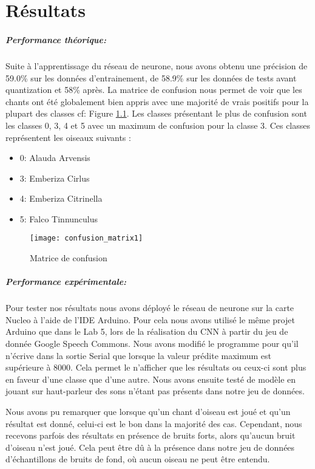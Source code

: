 \chapter{Résultats}


\paragraph{Performance théorique:} Suite à l'apprentissage du réseau de neurone, nous avons obtenu une précision de 59.0\% sur les données d'entrainement,
de 58.9\% sur les données de tests avant quantization et 58\% après.
La matrice de confusion nous permet de voir que les chants ont été globalement 
bien appris avec une majorité de vrais positifs pour la plupart des classes cf: Figure \ref{graph:confusion_matrix1}.
Les classes présentant le plus de confusion sont les classes 0, 3, 4 et 5 avec un maximum de confusion pour la classe 3.
Ces classes représentent les oiseaux suivants :

\begin{itemize}
  \item 0: Alauda Arvensis
  \item 3: Emberiza Cirlus
  \item 4: Emberiza Citrinella
  \item 5: Falco Tinnunculus
\end{itemize}

\begin{figure}[!ht]
  \texttt{[image: confusion\_matrix1]}
  \centering
  \caption{Matrice de confusion}
  \label{graph:confusion_matrix1}
\end{figure}

\paragraph{Performance expérimentale:} Pour tester nos résultats nous avons déployé le réseau de neurone sur la carte Nucleo à l'aide 
de l'IDE Arduino. Pour cela nous avons utilisé le même projet Arduino que dans le Lab 5, lors de la réalisation du CNN à partir du
jeu de donnée Google Speech Commons. Nous avons modifié le programme pour qu'il n'écrive dans la sortie Serial que lorsque la valeur prédite maximum
est supérieure à 8000. Cela permet le n'afficher que les résultats ou ceux-ci sont plus en faveur d'une classe que d'une autre.
Nous avons ensuite testé de modèle en jouant sur haut-parleur des sons n'étant pas présents dans notre jeu de données.

Nous avons pu remarquer que lorsque qu'un chant d'oiseau est joué et qu'un résultat est donné, celui-ci est le bon dans la majorité des cas.
Cependant, nous recevons parfois des résultats en présence de bruits forts, alors qu'aucun bruit d'oiseau n'est joué. 
Cela peut être dû à la présence dans notre jeu de données d'échantillons de bruits de fond, où aucun oiseau ne peut être entendu.

